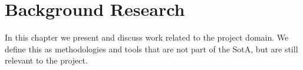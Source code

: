 \chapter{Background Research} \label{chap:background-research}
In this chapter we present and discuss work related to the project domain. We define this as methodologies and tools that are not part of the \ac{SotA}, but are still relevant to the project.





